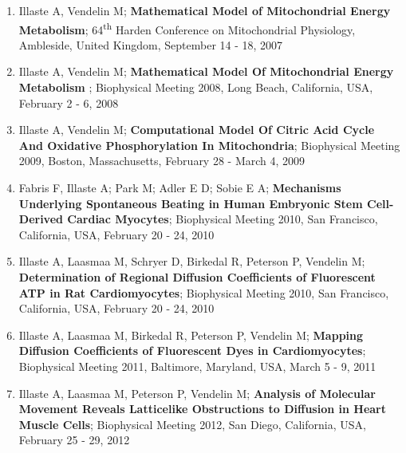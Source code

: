     \begin{enumerate}[I]

\item Illaste A, Vendelin M; {\bf Mathematical Model of Mitochondrial
  Energy Metabolism}; 64\textsuperscript{th} Harden Conference on Mitochondrial Physiology, Ambleside, United Kingdom, September 14 - 18, 2007

\item Illaste A, Vendelin M; {\bf Mathematical Model Of Mitochondrial Energy Metabolism
  }; Biophysical Meeting 2008, Long Beach, California, USA, February 2 - 6, 2008

\item Illaste A, Vendelin M; {\bf Computational Model Of Citric Acid
  Cycle And Oxidative Phosphorylation In Mitochondria}; Biophysical
  Meeting 2009, Boston, Massachusetts, February 28 - March 4, 2009

\item Fabris F, Illaste A; Park M; Adler E D; Sobie E A; {\bf
Mechanisms Underlying Spontaneous Beating in Human Embryonic Stem
Cell-Derived Cardiac Myocytes}; Biophysical Meeting 2010, San Francisco,
California, USA, February 20 - 24, 2010

\item Illaste A, Laasmaa M, Schryer D, Birkedal R, Peterson P,
  Vendelin M; {\bf Determination of Regional Diffusion Coefficients
  of Fluorescent ATP in Rat Cardiomyocytes}; Biophysical Meeting 2010, San Francisco,
California, USA, February 20 - 24, 2010
  
\item Illaste A, Laasmaa M, Birkedal R, Peterson P,
  Vendelin M; {\bf Mapping Diffusion Coefficients of Fluorescent
  Dyes in Cardiomyocytes}; Biophysical Meeting 2011, Baltimore, Maryland, USA, March 5 - 9, 2011

\item Illaste A, Laasmaa M, Peterson P, Vendelin M; {\bf
    Analysis of Molecular Movement Reveals Latticelike Obstructions to
    Diffusion in Heart Muscle Cells}; Biophysical Meeting 2012, San Diego, California, USA, February 25 - 29, 2012

    \end{enumerate}
